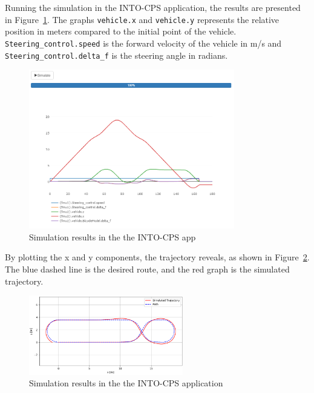 Running the simulation in the INTO-CPS application, the results are presented in Figure~\ref{fig:results1}. The graphs \texttt{vehicle.x} and \texttt{vehicle.y} represents the relative position in meters compared to the initial point of the vehicle. \texttt{Steering\_control.speed} is the forward velocity of the vehicle in m/s and \texttt{Stee\-ring\_con\-trol.delta\_f} is the steering angle in radians. 

\begin{figure}[!h]
	\begin{center}
		\includegraphics[width=0.8\textwidth]{vehicle/result1.png}
		\caption{Simulation results in the the INTO-CPS app}
		\label{fig:results1}
	\end{center}
\end{figure}

By plotting the x and y components, the trajectory reveals, as shown in Figure~\ref{fig:results1a}. The blue dashed line is the desired route, and the red graph is the simulated trajectory.

\begin{figure}[!h]
	\begin{center}
		\includegraphics[width=0.6\textwidth]{vehicle/result1a.png}
		\caption{Simulation results in the the INTO-CPS application}
		\label{fig:results1a}
	\end{center}
\end{figure}
